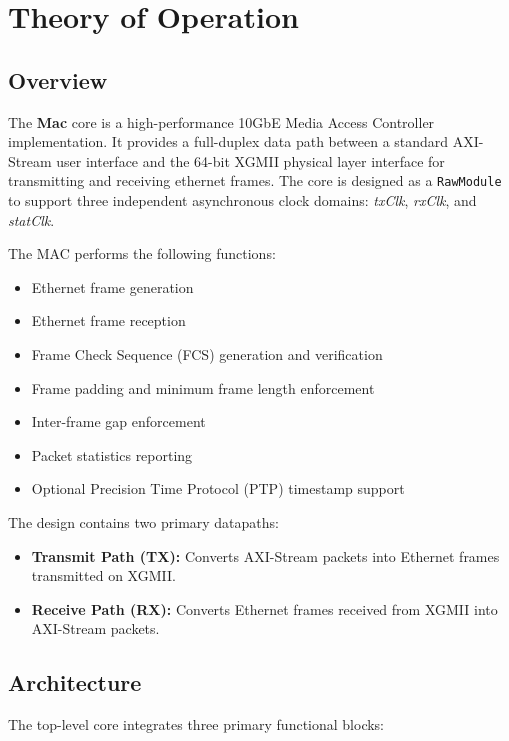 \section{Theory of Operation}

\subsection{Overview}
The \textbf{Mac} core is a high-performance 10GbE Media Access Controller implementation. 
It provides a full-duplex data path between a standard AXI-Stream user interface and the 64-bit XGMII physical layer interface for transmitting and receiving ethernet frames. 
The core is designed as a \texttt{RawModule} to support three independent asynchronous clock domains: \textit{txClk}, \textit{rxClk}, and \textit{statClk}.

The MAC performs the following functions:
\begin{itemize}
    \item Ethernet frame generation
    \item Ethernet frame reception
    \item Frame Check Sequence (FCS) generation and verification
    \item Frame padding and minimum frame length enforcement
    \item Inter-frame gap enforcement
    \item Packet statistics reporting
    \item Optional Precision Time Protocol (PTP) timestamp support
\end{itemize}

The design contains two primary datapaths:
\begin{itemize}
    \item \textbf{Transmit Path (TX):} Converts AXI-Stream packets into Ethernet frames transmitted on XGMII.
    \item \textbf{Receive Path (RX):} Converts Ethernet frames received from XGMII into AXI-Stream packets.
\end{itemize}

\subsection{Architecture}
The top-level core integrates three primary functional blocks:

